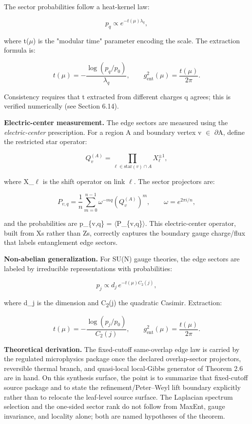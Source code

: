 The sector probabilities follow a heat-kernel law:

\[
p_q \propto e^{-t(\mu) \lambda_q},
\]

where t(\ensuremath{\mu}) is the "modular time" parameter encoding the scale. The extraction formula is:

\[
t(\mu) = -\frac{\log(p_q/p_0)}{\lambda_q}, \qquad
g_{\mathrm{ent}}^2(\mu) = \frac{t(\mu)}{2\pi}.
\]

Consistency requires that t extracted from different charges q agrees; this is verified numerically (see Section 6.14).

\textbf{Electric-center measurement.} The edge sectors are measured using the \emph{electric-center} prescription. For a region A and boundary vertex v \ensuremath{\in} \ensuremath{\partial}A, define the restricted star operator:

\[
Q_v^{(A)} = \prod_{\ell \in \mathrm{star}(v) \cap A} X_\ell^{\pm 1},
\]

where X\_\ensuremath{\ell} is the shift operator on link \ensuremath{\ell}. The sector projectors are:

\[
P_{v,q} = \frac{1}{n} \sum_{m=0}^{n-1} \omega^{-mq} \left(Q_v^{(A)}\right)^m,
\qquad \omega = e^{2\pi i/n},
\]

and the probabilities are p\_\{v,q\} = \ensuremath{\langle}P\_\{v,q\}\ensuremath{\rangle}. This electric-center operator, built from X\textquotesingle s rather than Z\textquotesingle s, correctly captures the boundary gauge charge/flux that labels entanglement edge sectors.

\textbf{Non-abelian generalization.} For SU(N) gauge theories, the edge sectors are labeled by irreducible representations with probabilities:

\[
p_j \propto d_j \, e^{-t(\mu) C_2(j)},
\]

where d\_j is the dimension and C\textsubscript{2}(j) the quadratic Casimir. Extraction:

\[
t(\mu) = -\frac{\log(p_j/p_0)}{C_2(j)}, \qquad
g_{\mathrm{ent}}^2(\mu) = \frac{t(\mu)}{2\pi}.
\]

\textbf{Theoretical derivation.} The fixed-cutoff same-overlap edge law is carried by the
regulated microphysics package once the declared overlap-sector projectors, reversible thermal
branch, and quasi-local local-Gibbs generator of Theorem 2.6 are in hand. On this synthesis
surface, the point is to summarize that fixed-cutoff source package and to state the
refinement/Peter--Weyl lift boundary explicitly rather than to relocate the leaf-level source
surface. The Laplacian spectrum selection and the one-sided sector rank do not follow from
MaxEnt, gauge invariance, and locality alone; both are named hypotheses of the theorem.

